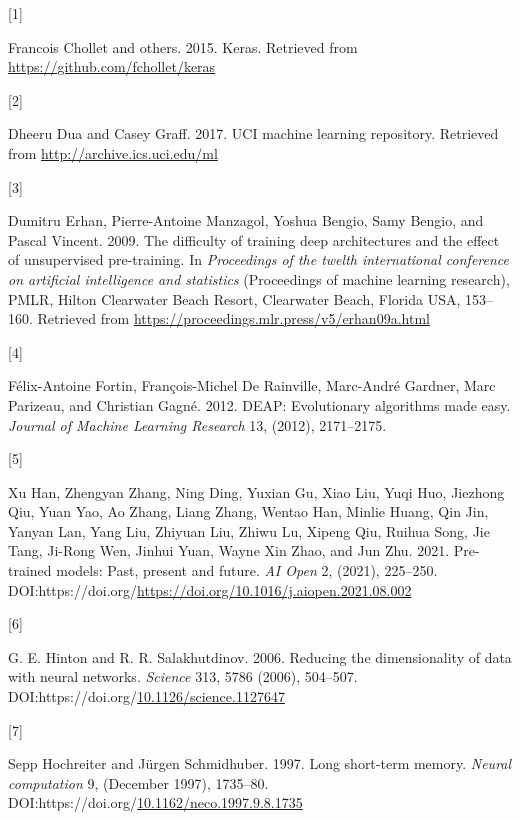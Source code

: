 \documentclass[
  11pt,
]{article}
\newlength{\cslhangindent}
\newlength{\csllabelwidth}
\newlength{\cslentryspacingunit} %
\newenvironment{CSLReferences}[2] %
 {%
  \setlength{\parindent}{0pt}
  \ifodd #1
  \let\oldpar\par
  \def\par{\hangindent=\cslhangindent\oldpar}
  \fi
  \setlength{\parskip}{#2\cslentryspacingunit}
 }%
 {}
\newcommand{\CSLLeftMargin}[1]{\parbox[t]{\csllabelwidth}{#1}}
\newcommand{\CSLRightInline}[1]{\parbox[t]{\linewidth - \csllabelwidth}{#1}\break}
\begin{document}
\hypertarget{refs}{}
\begin{CSLReferences}{0}{0}
\leavevmode{}%
\CSLLeftMargin{{[}1{]} }%
\CSLRightInline{Francois Chollet and others. 2015. Keras. Retrieved from
\url{https://github.com/fchollet/keras}}

\leavevmode{}%
\CSLLeftMargin{{[}2{]} }%
\CSLRightInline{Dheeru Dua and Casey Graff. 2017. {UCI} machine learning
repository. Retrieved from \url{http://archive.ics.uci.edu/ml}}

\leavevmode{}%
\CSLLeftMargin{{[}3{]} }%
\CSLRightInline{Dumitru Erhan, Pierre-Antoine Manzagol, Yoshua Bengio,
Samy Bengio, and Pascal Vincent. 2009. The difficulty of training deep
architectures and the effect of unsupervised pre-training. In
\emph{Proceedings of the twelth international conference on artificial
intelligence and statistics} (Proceedings of machine learning research),
PMLR, Hilton Clearwater Beach Resort, Clearwater Beach, Florida USA,
153--160. Retrieved from
\url{https://proceedings.mlr.press/v5/erhan09a.html}}

\leavevmode{}%
\CSLLeftMargin{{[}4{]} }%
\CSLRightInline{Félix-Antoine Fortin, François-Michel De Rainville,
Marc-André Gardner, Marc Parizeau, and Christian Gagné. 2012. {DEAP}:
Evolutionary algorithms made easy. \emph{Journal of Machine Learning
Research} 13, (2012), 2171--2175.}

\leavevmode{}%
\CSLLeftMargin{{[}5{]} }%
\CSLRightInline{Xu Han, Zhengyan Zhang, Ning Ding, Yuxian Gu, Xiao Liu,
Yuqi Huo, Jiezhong Qiu, Yuan Yao, Ao Zhang, Liang Zhang, Wentao Han,
Minlie Huang, Qin Jin, Yanyan Lan, Yang Liu, Zhiyuan Liu, Zhiwu Lu,
Xipeng Qiu, Ruihua Song, Jie Tang, Ji-Rong Wen, Jinhui Yuan, Wayne Xin
Zhao, and Jun Zhu. 2021. Pre-trained models: Past, present and future.
\emph{AI Open} 2, (2021), 225--250.
DOI:https://doi.org/\url{https://doi.org/10.1016/j.aiopen.2021.08.002}}

\leavevmode{}%
\CSLLeftMargin{{[}6{]} }%
\CSLRightInline{G. E. Hinton and R. R. Salakhutdinov. 2006. Reducing the
dimensionality of data with neural networks. \emph{Science} 313, 5786
(2006), 504--507.
DOI:https://doi.org/\href{https://doi.org/10.1126/science.1127647}{10.1126/science.1127647}}

\leavevmode{}%
\CSLLeftMargin{{[}7{]} }%
\CSLRightInline{Sepp Hochreiter and Jürgen Schmidhuber. 1997. Long
short-term memory. \emph{Neural computation} 9, (December 1997),
1735--80.
DOI:https://doi.org/\href{https://doi.org/10.1162/neco.1997.9.8.1735}{10.1162/neco.1997.9.8.1735}}


\end{CSLReferences}
\end{document}
